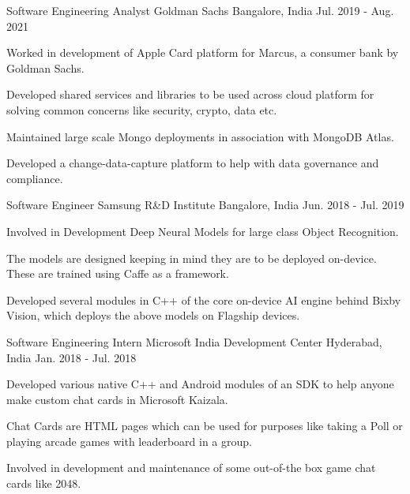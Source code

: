 \begin{cventries}
\cventry
    {Software Engineering Analyst} %
    {Goldman Sachs} %
    {Bangalore, India} %
    {Jul. 2019 - Aug. 2021} %
    {
      \begin{cvitems} %
        \item {Worked in development of Apple Card platform for Marcus, a consumer bank by Goldman Sachs.}
        \item {Developed shared services and libraries to be used across cloud platform for solving common concerns like security, crypto, data etc.}
        \item {Maintained large scale Mongo deployments in association with MongoDB Atlas.}
        \item {Developed a change-data-capture platform to help with data governance and compliance.}
      \end{cvitems}
    }
  \cventry
    {Software Engineer} %
    {Samsung R\&D Institute} %
    {Bangalore, India} %
    {Jun. 2018 - Jul. 2019} %
    {
      \begin{cvitems} %
        \item {Involved in Development Deep Neural Models for large class Object Recognition.}
        \item {The models are designed keeping in mind they are to be deployed on-device. These are trained using Caffe as a framework.}
        \item {Developed several modules in C++ of the core on-device AI engine behind Bixby Vision, which deploys the above models on Flagship devices.}
      \end{cvitems}
    }
  \cventry
    {Software Engineering Intern} %
    {Microsoft India Development Center} %
    {Hyderabad, India} %
    {Jan. 2018 - Jul. 2018} %
    {
      \begin{cvitems} %
        \item {Developed various native C++ and Android modules of an SDK to help anyone make custom chat cards in Microsoft Kaizala.}
        \item {Chat Cards are HTML pages which can be used for purposes like taking a Poll or playing arcade games with leaderboard in a group.}
        \item {Involved in development and maintenance of some out-of-the box game chat cards like 2048.}
      \end{cvitems}
    }


\end{cventries}
